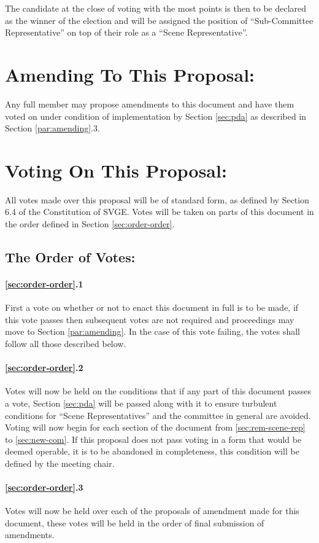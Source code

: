 \documentclass[10pt, a4paper]{article}
\begin{document}
The candidate at the close of voting with the most points is then to be declared as the winner of the election and will be assigned the position of ``Sub-Committee Representative'' on top of their role as a ``Scene Representative''.


\section{Amending To This Proposal:\label{sec:amend}}
Any full member may propose amendments to this document and have them voted on under condition of implementation by Section \ref{sec:pda} as described in Section \ref{par:amending}.3.

\section{Voting On This Proposal:\label{sec:the-vote}}
All votes made over this proposal will be of standard form, as defined by Section 6.4 of the Constitution of SVGE. Votes will be taken on parts of this document in the order defined in Section \ref{sec:order-order}.

\subsection{The Order of Votes:\label{sec:order-order}}

\paragraph{\ref{sec:order-order}.1} First a vote on whether or not to enact this document in full is to be made, if this vote passes then subsequent votes are not required and proceedings may move to Section \ref{par:amending}. In the case of this vote failing, the votes shall follow all those described below.

\paragraph{\ref{sec:order-order}.2} Votes will now be held on the conditions that if any part of this document passes a vote, Section \ref{sec:pda} will be passed along with it to ensure turbulent conditions for ``Scene Representatives'' and the committee in general are avoided. Voting will now begin for each section of the document from \ref{sec:rem-scene-rep} to \ref{sec:new-com}. If this proposal does not pass voting in a form that would be deemed operable, it is to be abandoned in completeness, this condition will be defined by the meeting chair.

\paragraph{\ref{sec:order-order}.3\label{par:amending}} Votes will now be held over each of the proposals of amendment made for this document, these votes will be held in the order of final submission of amendments.
\end{document}
